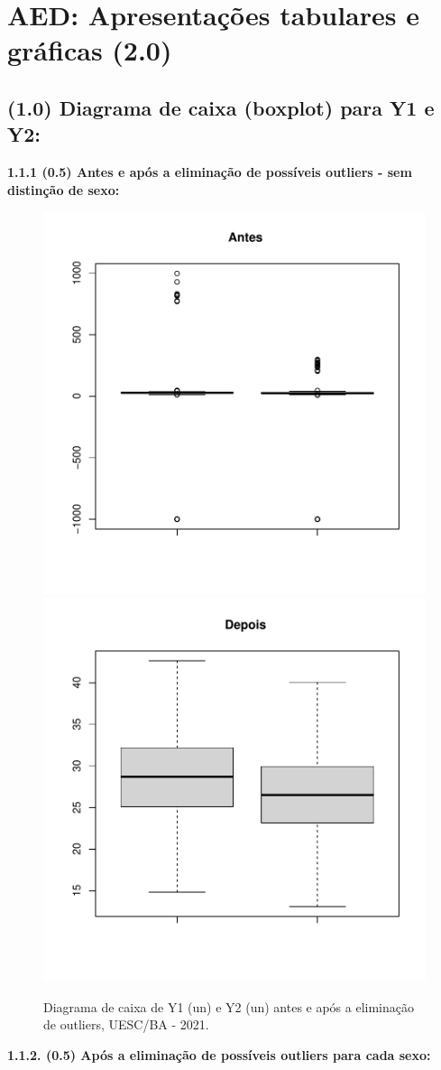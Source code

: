 \documentclass[12pt]{article}\usepackage[]{graphicx}\usepackage[]{color}
\newenvironment{knitrout}{}{} %
\begin{document}
\section{AED: Apresentações tabulares e gráficas (2.0)}
\subsection{(1.0) Diagrama de caixa (boxplot) para Y1 e Y2:} 
       \textbf{1.1.1 (0.5) Antes e após a eliminação de possíveis outliers - sem distinção de sexo:}

\begin{figure}[!h]
\label{figura:boxplot}
\begin{knitrout}
\color{fgcolor}

{\centering \includegraphics[width=.4\linewidth]{figure/minimal-boxplot-antes-1} 
\includegraphics[width=.4\linewidth]{figure/minimal-boxplot-antes-2} 

}


\end{knitrout}
\caption{Diagrama de caixa de Y1 (un) e Y2 (un) antes e após a eliminação de outliers, UESC/BA - 2021.}
\end{figure}

      \textbf{1.1.2. (0.5) Após a eliminação de possíveis outliers para cada sexo:}
\end{document}
